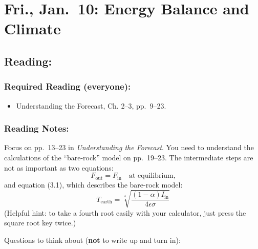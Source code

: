 \documentclass[
]{article}
\providecommand{\tightlist}{%
  \setlength{\itemsep}{0pt}\setlength{\parskip}{0pt}}
\begin{document}
\hypertarget{fri.-jan.-10-energy-balance-and-climate}{%
\section{Fri., Jan.~10: Energy Balance and
Climate}\label{fri.-jan.-10-energy-balance-and-climate}}

\hypertarget{reading-2}{%
\subsection{Reading:}\label{reading-2}}

\hypertarget{required-reading-everyone-1}{%
\subsubsection{Required Reading
(everyone):}\label{required-reading-everyone-1}}

\begin{itemize}
\tightlist
\item
  Understanding the Forecast, Ch. 2--3, pp.~9--23.
\end{itemize}

\hypertarget{reading-notes-1}{%
\subsubsection{Reading Notes:}\label{reading-notes-1}}

Focus on pp.~13--23 in \emph{Understanding the Forecast}. You need to
understand the calculations of the ``bare-rock'' model on pp.~19--23.
The intermediate steps are not as important as two equations: \[
  F_{\text{out}} = F_{\text{in}}\quad\text{at equilibrium,}
\] and equation (3.1), which describes the bare-rock model: \[
  T_{\text{earth}} =
  \sqrt[4]{\frac{(1-\alpha)I_{\text{in}}}{4\epsilon\sigma}}
\] (Helpful hint: to take a fourth root easily with your calculator,
just press the square root key twice.)

Questions to think about (\textbf{not} to write up and turn in):
\end{document}
